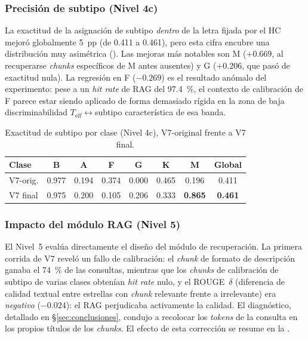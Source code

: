 \subsubsection{Precisión de subtipo (Nivel 4c)}
\label{sec:res-l4c}

La exactitud de la asignación de subtipo \emph{dentro} de la letra fijada por el
HC mejoró globalmente \num{+5}~pp (de \num{0.411} a \num{0.461}), pero esta cifra
encubre una distribución muy asimétrica (). Las mejoras más notables
son M ($+0.669$, al recuperarse \emph{chunks} específicos de M antes ausentes) y G
($+0.206$, que pasó de exactitud nula). La regresión en F ($-0.269$) es el
resultado anómalo del experimento: pese a un \emph{hit rate} de RAG del
\SI{97.4}{\percent}, el contexto de calibración de F parece estar siendo aplicado
de forma demasiado rígida en la zona de baja discriminabilidad
$T_\mathrm{eff}\leftrightarrow$subtipo característica de esa banda.

\begin{table}[H]
  \centering
  \caption{Exactitud de subtipo por clase (Nivel 4c), V7-original frente a
  V7 final.}
  \label{tab:l4c}
  \begin{tabular}{lccccccc}
    \toprule
    Clase & B & A & F & G & K & M & \textbf{Global} \\
    \midrule
    V7-orig. & 0.977 & 0.194 & 0.374 & 0.000 & 0.465 & 0.196 & 0.411 \\
    V7 final & 0.975 & 0.200 & 0.105 & 0.206 & 0.333 & \textbf{0.865} & \textbf{0.461} \\
    \bottomrule
  \end{tabular}
\end{table}

\subsubsection{Impacto del módulo RAG (Nivel 5)}
\label{sec:res-rag}

El Nivel~5 evalúa directamente el diseño del módulo de recuperación. La primera
corrida de V7 reveló un fallo de calibración: el \emph{chunk} de formato de
descripción ganaba el \SI{74}{\percent} de las consultas, mientras que los
\emph{chunks} de calibración de subtipo de varias clases obtenían \emph{hit rate}
nulo, y el ROUGE~$\delta$ (diferencia de calidad textual entre estrellas con
\emph{chunk} relevante frente a irrelevante) era \emph{negativo}
($-0.024$): el RAG perjudicaba activamente la calidad. El diagnóstico, detallado
en §\ref{sec:conclusiones}, condujo a recolocar los \emph{tokens} de la consulta
en los propios títulos de los \emph{chunks}. El efecto de esta corrección se
resume en la .

